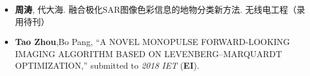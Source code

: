 %
%



\begin{itemize}
	\item \textbf{周涛}, 代大海. 融合极化SAR图像色彩信息的地物分类新方法. 无线电工程（录用待刊）\\
	 { \footnotesize {}}
	\item \textbf{Tao Zhou},Bo Pang, ``A NOVEL MONOPULSE FORWARD-LOOKING IMAGING ALGORITHM BASED ON LEVENBERG–MARQUARDT OPTIMIZATION,''
	submitted to \emph{2018 IET} (\textbf{EI}).\\
	 { \footnotesize {}}
\end{itemize}